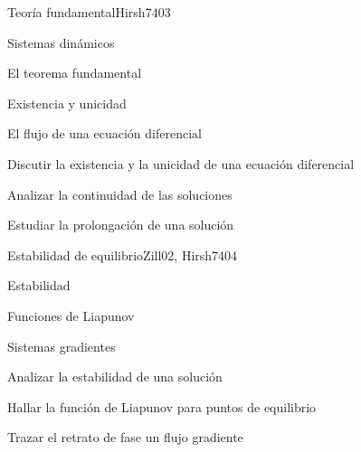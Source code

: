 \begin{syllabus}
\begin{unit}{Teoría fundamental}{}{Hirsh74}{0}{3}
\begin{topics}
      \item Sistemas dinámicos
      \item El teorema fundamental
      \item Existencia y unicidad
      \item El flujo de una ecuación diferencial
   \end{topics}

   \begin{learningoutcomes}
      \item Discutir la existencia y la unicidad de una ecuación diferencial
      \item Analizar la continuidad de las soluciones
      \item Estudiar la prolongación de una solución

   \end{learningoutcomes}
\end{unit}

\begin{unit}{Estabilidad de equilibrio}{}{Zill02, Hirsh74}{0}{4}
\begin{topics}
      \item Estabilidad
      \item Funciones de Liapunov
      \item Sistemas gradientes
   \end{topics}

   \begin{learningoutcomes}
      \item Analizar la estabilidad de una solución
      \item Hallar la función de Liapunov para puntos de  equilibrio
      \item Trazar el retrato de fase un flujo gradiente
    \end{learningoutcomes}
\end{unit}

\begin{coursebibliography}
\end{coursebibliography}

\end{syllabus}
